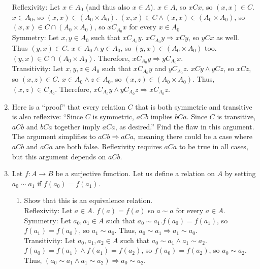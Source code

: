 \documentclass{article}
\begin{document}
\begin{enumerate}
            Reflexivity: Let $x \in A_{0}$ (and thus also $x \in A$). $x \in A$, so $xCx$, so $(x, x) \in C$. $x \in A_{0}$, so $(x, x) \in (A_{0} \times A_{0})$. $(x, x) \in C \land (x, x) \in (A_{0} \times A_{0})$, so $(x, x) \in C \cap (A_{0} \times A_{0})$, so $xC_{A_{0}}x$ for every $x \in A_{0}$\\
            Symmetry: Let $x, y \in A_{0}$ such that $xC_{A_{0}}y$. $xC_{A_{0}}y \Rightarrow xCy$, so $yCx$ as well. Thus $(y, x) \in C$. $x \in A_{0} \land y \in A_{0}$, so $(y, x) \in (A_{0} \times A_{0})$ too. $(y, x) \in C \cap (A_{0} \times A_{0})$. Therefore, $xC_{A_{0}}y \Rightarrow yC_{A_{0}}x$.\\
            Transitivity: Let $x, y, z \in A_{0}$ such that $xC_{A_{0}}y$ and $yC_{A_{0}}z$. $xCy \land yCz$, so $xCz$, so $(x, z) \in C$. $x \in A_{0} \land z \in A_{0}$, so $(x, z) \in (A_{0} \times A_{0})$. Thus, $(x, z) \in C_{A_{0}}$. Therefore, $xC_{A_{0}}y \land yC_{A_{0}}z \Rightarrow xC_{A_{0}}z$.
      \item Here is a “proof” that every relation $C$ that is both symmetric and transitive is also reflexive: “Since $C$ is symmetric, $aCb$ implies $bCa$. Since $C$ is transitive, $aCb$ and $bCa$ together imply $aCa$, as desired.” Find the flaw in this argument.\\
            The argument simplifies to $aCb \Rightarrow aCa$, meaning there could be a case where $aCb$ and $aCa$ are both false. Reflexivity requires $aCa$ to be true in all cases, but this argument depends on $aCb$.
      \item Let $f:A \to B$ be a surjective function. Let us define a relation on $A$ by setting $a_{0} \sim a_{1}$ if $f(a_{0}) = f(a_{1})$.
            \begin{enumerate}
                  \item Show that this is an equivalence relation.\\
                        Reflexivity: Let $a \in A$. $f(a) = f(a)$ so $a \sim a$ for every $a \in A$.\\
                        Symmetry: Let $a_{0}, a_{1} \in A$ such that $a_{0} \sim a_{1}$.$f(a_{0}) = f(a_{1})$, so $f(a_{1}) = f(a_{0})$, so $a_{1} \sim a_{0}$. Thus, $a_{0} \sim a_{1} \Rightarrow a_{1} \sim a_{0}$.\\
                        Transitivity: Let $a_{0}, a_{1}, a_{2} \in A$ such that $a_{0} \sim a_{1} \land a_{1} \sim a_{2}$. $f(a_{0}) = f(a_{1}) \land f(a_{1}) = f(a_{2})$, so $f(a_{0}) = f(a_{2})$, so $a_{0} \sim a_{2}$. Thus, $(a_{0} \sim a_{1} \land a_{1} \sim a_{2}) \Rightarrow a_{0} \sim a_{2}$.

\end{enumerate}
\end{enumerate}
\end{document}
